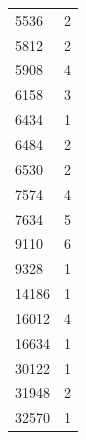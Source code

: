 \begin{table}[ht]
{\begin{tabular}{lr}
            5536                                              & 2                                                    \\
            5812                                              & 2                                                    \\
            5908                                              & 4                                                    \\
            6158                                              & 3                                                    \\
            6434                                              & 1                                                    \\
            6484                                              & 2                                                    \\
            6530                                              & 2                                                    \\
            7574                                              & 4                                                    \\
            7634                                              & 5                                                    \\
            9110                                              & 6                                                    \\
            9328                                              & 1                                                    \\
            14186                                             & 1                                                    \\
            16012                                             & 4                                                    \\
            16634                                             & 1                                                    \\
            30122                                             & 1                                                    \\
            31948                                             & 2                                                    \\
            32570                                             & 1                                                    \\

\end{tabular}}
\end{table}
